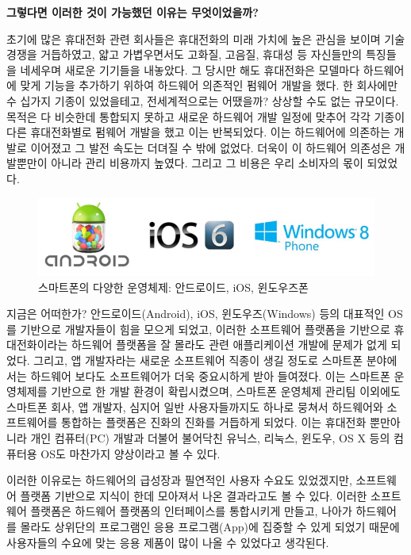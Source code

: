 \begin{center} 
\textbf{그렇다면 이러한 것이 가능했던 이유는 무엇이었을까? }
\end{center}


초기에 많은 휴대전화 관련 회사들은 휴대전화의 미래 가치에 높은 관심을 보이며 기술 경쟁을 거듭하였고, 얇고 가볍우면서도 고화질, 고음질, 휴대성 등 자신들만의 특징들을 네세우며 새로운 기기들을 내놓았다.
그 당시만 해도 휴대전화은 모델마다 하드웨어에 맞게 기능을 추가하기 위하여 하드웨어 의존적인 펌웨어 개발을 했다.
한 회사에만 수 십가지 기종이 있었을테고, 전세계적으로는 어땠을까?
상상할 수도 없는 규모이다.
목적은 다 비슷한데 통합되지 못하고 새로운 하드웨어 개발 일정에 맞추어 각각 기종이 다른 휴대전화별로 펌웨어 개발을 했고 이는 반복되었다.
이는 하드웨어에 의존하는 개발로 이어졌고 그 발전 속도는 더뎌질 수 밖에 없었다.
더욱이 이 하드웨어 의존성은 개발뿐만이 아니라 관리 비용까지 높였다.
그리고 그 비용은 우리 소비자의 몫이 되었었다. 

\begin{figure}[h]
\centering\includegraphics[width=\columnwidth]{pictures/chapter1/oss.png}
\caption{스마트폰의 다양한 운영체제: 안드로이드, iOS, 윈도우즈폰}
\end{figure}

지금은 어떠한가?
안드로이드(Android), iOS, 윈도우즈(Windows) 등의 대표적인 OS를 기반으로 개발자들이 힘을 모으게 되었고, 이러한 소프트웨어 플랫폼을 기반으로 휴대전화이라는 하드웨어 플랫폼을 잘 몰라도 관련 애플리케이션 개발에 문제가 없게 되었다.
그리고, 앱 개발자라는 새로운 소프트웨어 직종이 생길 정도로 스마트폰 분야에서는 하드웨어 보다도 소프트웨어가 더욱 중요시하게 받아 들여졌다.
이는 스마트폰 운영체제를 기반으로 한 개발 환경이 확립시켰으며, 스마트폰 운영체제 관리팀 이외에도 스마트폰 회사, 앱 개발자, 심지어 일반 사용자들까지도 하나로 뭉쳐서 하드웨어와 소프트웨어를 통합하는 플랫폼은 진화의 진화를 거듭하게 되었다.
이는 휴대전화 뿐만아니라 개인 컴퓨터(PC) 개발과 더불어 불어닥친 유닉스, 리눅스, 윈도우, OS X 등의 컴퓨터용 OS도 마찬가지 양상이라고 볼 수 있다.

이러한 이유로는 하드웨어의 급성장과 필연적인 사용자 수요도 있었겠지만, 소프트웨어 플랫폼 기반으로 지식이 한데 모아져서 나온 결과라고도 볼 수 있다.
이러한 소프트웨어 플랫폼은 하드웨어 플랫폼의 인터페이스를 통합시키게 만들고, 나아가 하드웨어를 몰라도 상위단의 프로그램인 응용 프로그램(App)에 집중할 수 있게 되었기 때문에 사용자들의 수요에 맞는 응용 제품이 많이 나올 수 있었다고 생각된다. 

